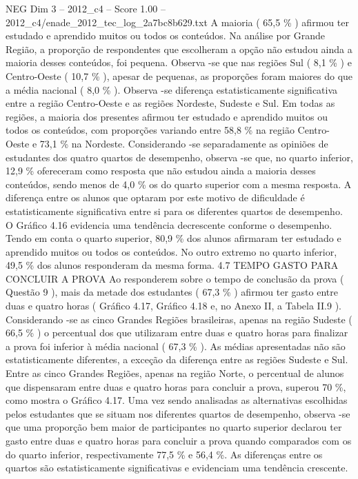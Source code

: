 \begin{textsample}{NEG Dim 3 – 2012\_c4 – Score 1.00 – 2012\_c4/enade\_2012\_tec\_log\_2a7bc8b629.txt}
A maioria ( 65,5 \% ) afirmou ter estudado e aprendido muitos ou todos os conteúdos.
Na análise por Grande Região, a proporção de respondentes que escolheram a opção não estudou ainda a maioria desses conteúdos, foi pequena.
Observa -se que nas regiões Sul ( 8,1 \% ) e Centro-Oeste ( 10,7 \% ), apesar de pequenas, as proporções foram maiores do que a média nacional ( 8,0 \% ).
Observa -se diferença estatisticamente significativa entre a região Centro-Oeste e as regiões Nordeste, Sudeste e Sul.
Em todas as regiões, a maioria dos presentes afirmou ter estudado e aprendido muitos ou todos os conteúdos, com proporções variando entre 58,8 \% na região Centro-Oeste e 73,1 \% na Nordeste.
Considerando -se separadamente as opiniões de estudantes dos quatro quartos de desempenho, observa -se que, no quarto inferior, 12,9 \% ofereceram como resposta que não estudou ainda a maioria desses conteúdos, sendo menos de 4,0 \% os do quarto superior com a mesma resposta.
A diferença entre os alunos que optaram por este motivo de dificuldade é estatisticamente significativa entre si para os diferentes quartos de desempenho.
O Gráfico 4.16 evidencia uma tendência decrescente conforme o desempenho.
Tendo em conta o quarto superior, 80,9 \% dos alunos afirmaram ter estudado e aprendido muitos ou todos os conteúdos.
No outro extremo no quarto inferior, 49,5 \% dos alunos responderam da mesma forma. 4.7 TEMPO GASTO PARA CONCLUIR A PROVA Ao responderem sobre o tempo de conclusão da prova ( Questão 9 ), mais da metade dos estudantes ( 67,3 \% ) afirmou ter gasto entre duas e quatro horas ( Gráfico 4.17, Gráfico 4.18 e, no Anexo II, a Tabela II.9 ).
Considerando -se as cinco Grandes Regiões brasileiras, apenas na região Sudeste ( 66,5 \% ) o percentual dos que utilizaram entre duas e quatro horas para finalizar a prova foi inferior à média nacional ( 67,3 \% ).
As médias apresentadas não são estatisticamente diferentes, a exceção da diferença entre as regiões Sudeste e Sul.
Entre as cinco Grandes Regiões, apenas na região Norte, o percentual de alunos que dispensaram entre duas e quatro horas para concluir a prova, superou 70 \%, como mostra o Gráfico 4.17.
Uma vez sendo analisadas as alternativas escolhidas pelos estudantes que se situam nos diferentes quartos de desempenho, observa -se que uma proporção bem maior de participantes no quarto superior declarou ter gasto entre duas e quatro horas para concluir a prova quando comparados com os do quarto inferior, respectivamente 77,5 \% e 56,4 \%.
As diferenças entre os quartos são estatisticamente significativas e evidenciam uma tendência crescente.

\end{textsample}
